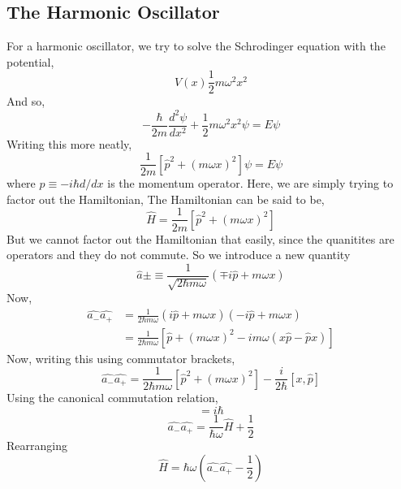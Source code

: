 	\subsection{The Harmonic Oscillator }
		For a harmonic oscillator, we try to solve the Schrodinger equation with the potential,
			\begin{equation}
				V(x)\frac{1}{2}m\omega^2x^2
			\end{equation}
			And so,
			\begin{equation}
				-\frac{\hbar}{2m}\frac{d^2\psi}{dx^2}+\frac{1}{2}m\omega^2x^2\psi=E\psi
			\end{equation}
			Writing this more neatly,
			\begin{equation}
				\frac{1}{2m}[\hat{p}^2+(m\omega x)^2]\psi=E\psi
			\end{equation}
		where $\hat{p}\equiv-i\hbar d/dx$ is the momentum operator. Here, we are simply trying to factor out the Hamiltonian,
		The Hamiltonian can be said to be,
				\begin{equation}
				\hat{H}=\frac{1}{2m}[\hat{p}^2+(m\omega x)^2]
				\end{equation}
			But we cannot factor out the Hamiltonian that easily, since the quanitites are operators and they do not commute. So we introduce a new quantity
			\begin{equation}
				\hat{a}\pm\equiv\frac{1}{\sqrt{2\hbar m\omega}}(\mp i\hat{p}+m\omega x)
			\end{equation}
		Now,
		\begin{align}
			\hat{a_-}\hat{a_+}&=\frac{1}{2\hbar m\omega}(i\hat{p}+m\omega x)(-i\hat{p}+m\omega x)\\
							  &=\frac{1}{2\hbar m\omega}[\hat{p}+(m \omega x)^2-im\omega(x\hat{p}-\hat{p}x)]
		\end{align}
			Now, writing this using commutator brackets,
			\begin{equation}
				\hat{a_-}\hat{a_+}=\frac{1}{2\hbar m\omega}[\hat{p}^2+(m\omega x)^2]-\frac{i}{2\hbar}[x,\hat{p}]
			\end{equation}
			Using the canonical commutation relation,
			\begin{equation*}
				[x,\hat{p}]=i\hbar
			\end{equation*}
			\begin{equation}
					\hat{a_-}\hat{a_+}=\frac{1}{\hbar \omega}\hat{H}+\frac{1}{2}
			\end{equation}
			Rearranging
				\begin{equation}
					\hat{H}=\hbar\omega\left(\hat{a_-}\hat{a_+}-\frac{1}{2}\right)
				\end{equation}
